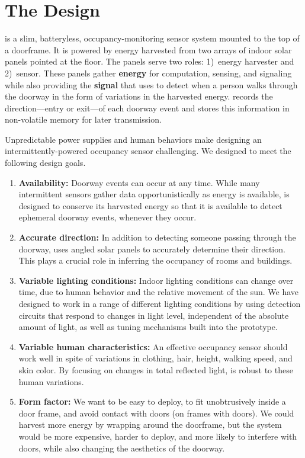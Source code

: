 \section{The \sysname Design}
\label{sec:system}
\sysname is a slim, batteryless, occupancy-monitoring sensor system mounted to the top of a doorframe.
It is powered by energy harvested from two arrays of indoor solar panels pointed at the floor.
The panels serve two roles: 1)~energy harvester and 2)~sensor.
These panels gather \textbf{energy} for computation, sensing, and signaling while also providing the \textbf{signal} that \sysname uses to detect when a person walks through the doorway in the form of variations in the harvested energy.
\sysname records the direction---entry or exit---of each doorway event and stores this information in non-volatile memory for later transmission.


 Unpredictable power supplies and human behaviors make designing an intermittently-powered occupancy sensor challenging.
We designed \sysname to meet the following design goals. 

\begin{enumerate}
	\item \textbf{Availability:} Doorway events can occur at any time.
	While many intermittent sensors gather data opportunistically as energy is available, \sysname is designed to conserve its harvested energy so that it is available to detect ephemeral doorway events, whenever they occur.
	\item \textbf{Accurate direction:} In addition to detecting someone passing through the doorway, \sysname uses angled solar panels to accurately determine their direction.
	This plays a crucial role in inferring the occupancy of rooms and buildings.
	\item \textbf{Variable lighting conditions:} Indoor lighting conditions can change over time, due to human behavior and the relative movement of the sun.
	We have designed \sysname to work in a range of different lighting conditions by using detection circuits that respond to changes in light level, independent of the absolute amount of light, as well as tuning mechanisms built into the prototype.
	\item \textbf{Variable human characteristics:} An effective occupancy sensor should work well in spite of variations in clothing, hair, height, walking speed, and skin color. By focusing on changes in total reflected light, \sysname is robust to these human variations.
	\item \textbf{Form factor:} We want \sysname to be easy to deploy, to fit unobtrusively inside a door frame, and avoid contact with doors (on frames with doors).
	We could harvest more energy by wrapping \sysname around the doorframe, but the system would be more expensive, harder to deploy, and more likely to interfere with doors, while also changing the aesthetics of the doorway.
\end{enumerate}

